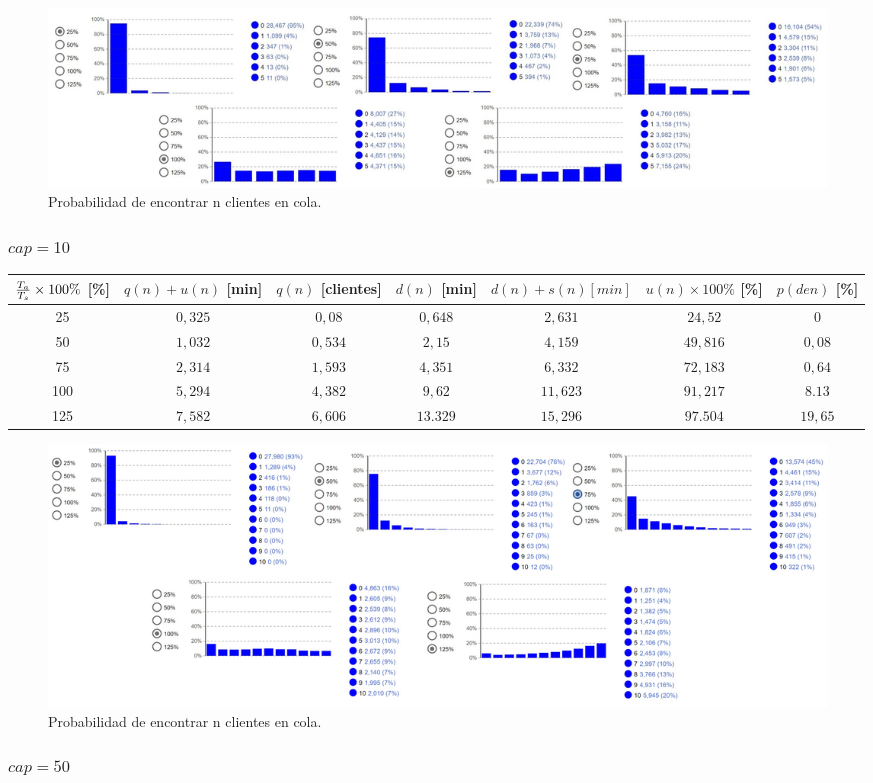 \begin{figure}[H]
  \includegraphics[width=\linewidth]{images/anylogic-colas-5}
  \caption{Probabilidad de encontrar n clientes en cola.}
\end{figure}

\subsubsection{$cap = 10$}

\begin{tabular}{||c||c|c|c|c|c|c||}
    \hline \hline
    ${T_a \over T_s}\times100\%$ [\%] & $q(n)+u(n)$ [min] & $q(n)$ [clientes] & $d(n)$ [min] & $d(n)+s(n) [min]$ & $u(n)\times100\%$ [\%] & $p(den)$ [\%] \\
    \hline \hline
    25 & $0,325$ & $0,08$ & $0,648$ & $2,631$ & $24,52$ & $0$ \\
    \hline
    50 & $1,032$ & $0,534$ & $2,15$ & $4,159$ & $49,816$ & $0,08$ \\
    \hline
    75 & $2,314$ & $1,593$ & $4,351$ & $6,332$ & $72,183$ & $0,64$ \\
    \hline
    100 & $5,294$ & $4,382$ & $9,62$ & $11,623$ & $91,217$ & $8.13$ \\
    \hline
    125 & $7,582$ & $6,606$ & $13.329$ & $15,296$ & $97.504$ & $19,65$ \\
    \hline \hline
\end{tabular}

\begin{figure}[H]
  \includegraphics[width=\linewidth]{images/anylogic-colas-10}
  \caption{Probabilidad de encontrar n clientes en cola.}
\end{figure}

\subsubsection{$cap = 50$}

